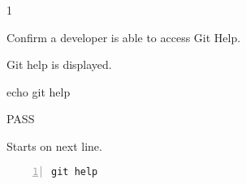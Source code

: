 \begin{description}[align=right,leftmargin=3.2cm,labelindent=3.0cm]
\item[Step:] 1
\item[Confirm:] Confirm a developer is able to access Git Help.
\item[Expectation:] Git help is displayed.
\item[Command:] echo git  help
\item[Test Result:] PASS
\item[Evidence:] Starts on next line.
\end{description}
\begin{lstlisting}[numbers=left]
git help

\end{lstlisting}
